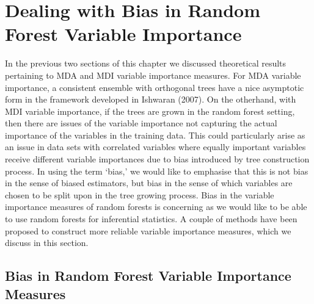 \documentclass[12pt,twoside]{reedthesis}
\theoremstyle{definition}
\theoremstyle{definition}
\theoremstyle{definition}
\theoremstyle{remark}
\begin{document}
\section{Dealing with Bias in Random Forest Variable
Importance}\label{dealing-with-bias-in-random-forest-variable-importance}

In the previous two sections of this chapter we discussed theoretical
results pertaining to MDA and MDI variable importance measures. For MDA
variable importance, a consistent ensemble with orthogonal trees have a
nice asymptotic form in the framework developed in Ishwaran (2007). On
the otherhand, with MDI variable importance, if the trees are grown in
the random forest setting, then there are issues of the variable
importance not capturing the actual importance of the variables in the
training data. This could particularly arise as an issue in data sets
with correlated variables where equally important variables receive
different variable importances due to bias introduced by tree
construction process. In using the term `bias,' we would like to
emphasise that this is not bias in the sense of biased estimators, but
bias in the sense of which variables are chosen to be split upon in the
tree growing process. Bias in the variable importance measures of random
forests is concerning as we would like to be able to use random forests
for inferential statistics. A couple of methods have been proposed to
construct more reliable variable importance measures, which we discuss
in this section.

\subsection{Bias in Random Forest Variable Importance
Measures}\label{bias-in-random-forest-variable-importance-measures}
\end{document}
